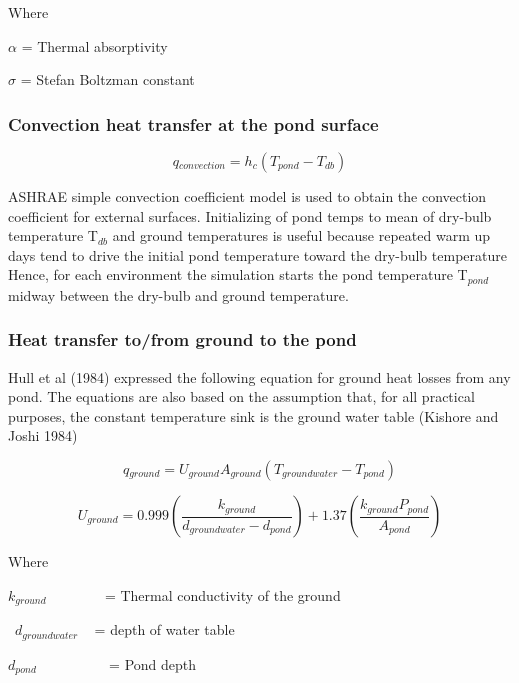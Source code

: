 Where

\(\alpha\) = Thermal absorptivity

\(\sigma\) = Stefan Boltzman constant

\subsubsection{Convection heat transfer at the pond surface}\label{convection-heat-transfer-at-the-pond-surface}

\begin{equation}
q{}_{convection} = h{}_c(T{}_{pond} - T{}_{db})
\end{equation}

ASHRAE simple convection coefficient model is used to obtain the convection coefficient for external surfaces. Initializing of pond temps to mean of dry-bulb temperature T\(_{db}\) and ground temperatures is useful because repeated warm up days tend to drive the initial pond temperature toward the dry-bulb temperature Hence, for each environment the simulation starts the pond temperature T\(_{pond}\) midway between the dry-bulb and ground temperature.

\subsubsection{Heat transfer to/from ground to the pond}\label{heat-transfer-tofrom-ground-to-the-pond}

Hull et al (1984) expressed the following equation for ground heat losses from any pond. The equations are also based on the assumption that, for all practical purposes, the constant temperature sink is the ground water table (Kishore and Joshi 1984)

\begin{equation}
q{}_{ground} = U{}_{ground}A{}_{ground}(T{}_{groundwater} - T{}_{pond})
\end{equation}

\begin{equation}
U{}_{ground} = 0.999\left( {\frac{{k{}_{ground}}}{{d{}_{groundwater} - d{}_{pond}}}} \right) + 1.37\left( {\frac{{k{}_{ground}P{}_{pond}}}{{A{}_{pond}}}} \right)
\end{equation}

Where

\(k{}_{ground}\) ~~~~~~~ = Thermal conductivity of the ground

~\(d{}_{groundwater}\) ~ = depth of water table

\(d{}_{pond}\) ~~~~~~~~~ = Pond depth


